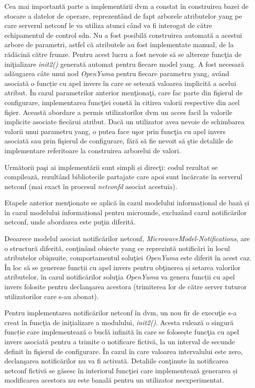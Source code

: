 Cea mai importantă parte a implementării \gls{dvm} a constat în construirea bazei de stocare a datelor de operare, reprezentând de fapt arborele atributelor \gls{yang} pe care serverul \gls{netconf} le va utiliza atunci când va fi interogat de către echipamentul de control \gls{sdn}. Nu a fost posibilă construirea automată a acestui arbore de parametri, astfel că atributele au fost implementate manual, de la rădăcină către frunze. Pentru acest lucru a fost nevoie să se altereze funcţia de iniţializare \textit{init2()} generată automat pentru fiecare model \gls{yang}. A fost necesară adăugarea câte unui nod \textit{OpenYuma} pentru fiecare parametru \gls{yang}, având asociată o funcție cu apel invers în care se setează valoarea implicită a acelui atribut. În cazul parametrilor anterior menţionaţi, care fac parte din fişierul de configurare, implementarea funcţiei constă în citirea valorii respective din acel fişier. Această abordare a permis utilizatorilor \gls{dvm} un acces facil la valorile implicite asociate fiecărui atribut. Dacă un utilizator avea nevoie de schimbarea valorii unui parametru \gls{yang}, o putea face uşor prin funcţia cu apel invers asociată sau prin fişierul de configurare, fără să fie nevoit să ştie detaliile de implementare referitoare la construirea arborelui de valori.

Următorii paşi ai implementării sunt simpli și direcţi: codul rezultat se compilează, rezultând bibliotecile partajate care apoi sunt încărcate în serverul \gls{netconf} (mai exact în procesul \textit{netconfd} asociat acestuia).

Etapele anterior menţionate se aplică în cazul modelului informațional de bază și în cazul modelului informațional pentru microunde, excluzând cazul notificărilor \gls{netconf}, unde abordarea este puţin diferită.

Deoarece modelul asociat notificărilor \gls{netconf}, \textit{MicrowaveModel-Notifications}, are o structură diferită, conţinând obiecte \gls{yang} ce reprezintă notificări în locul atributelor obişnuite, comportamentul soluţiei \textit{OpenYuma} este diferit în acest caz. În loc să se genereze funcții cu apel invers pentru obţinerea și setarea valorilor atributelor, în cazul notificărilor soluţia \textit{OpenYuma} va genera funcții cu apel invers folosite pentru declanşarea acestora (trimiterea lor de către server tuturor utilizatorilor care s-au abonat).

Pentru implementarea notificărilor \gls{netconf} în \gls{dvm}, un nou fir de execuţie s-a creat în funcţia de iniţializare a modulului, \textit{init2()}. Acesta rulează o singură funcție care implementează o buclă infinită în care se folosește funcţia cu apel invers asociată pentru a trimite o notificare fictivă, la un interval de secunde definit în fişierul de configurare. În cazul în care valoarea intervalului este zero, declanşarea notificărilor nu va fi activată. Detaliile conţinute în notificarea \gls{netconf} fictivă se găsesc în interiorul funcţiei care implementează generarea și modificarea acestora nu este banală pentru un utilizator neexperimentat.


